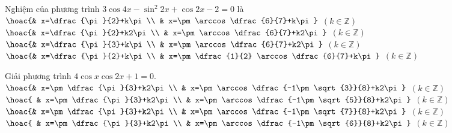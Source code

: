 \begin{ex}%
	Nghiệm của phương trình $3\cos 4x-\sin^2 2x+\cos 2x-2=0$ là 
	\choice
	{$\hoac{& x=\dfrac{\pi }{2}+k\pi  \\ & x=\pm \arccos \dfrac{6}{7}+k\pi }$ $\left(k\in \mathbb{Z}\right)$}
	{$\hoac{& x=\dfrac{\pi }{2}+k2\pi \\ & x=\pm \arccos \dfrac{6}{7}+k2\pi }$ $\left(k\in \mathbb{Z}\right)$}
	{$\hoac{& x=\dfrac{\pi }{3}+k\pi \\ & x=\pm \arccos \dfrac{6}{7}+k2\pi }$ $\left(k\in \mathbb{Z}\right)$}
	{\True $\hoac{& x=\dfrac{\pi }{2}+k\pi  \\ & x=\pm \dfrac{1}{2} \arccos \dfrac{6}{7}+k\pi }$ $\left(k\in \mathbb{Z}\right)$}
\end{ex}

\begin{ex}%
	
	Giải phương trình $4 \cos x\cos 2x+1=0$.
	\choice
	{$\hoac{& x=\pm \dfrac{\pi }{3}+k2\pi  \\ & x=\pm \arccos \dfrac{-1\pm \sqrt{3}}{8}+k2\pi }$ $\left(k\in \mathbb{Z}\right)$}
	{\True $\hoac{
			& x=\pm \dfrac{\pi }{3}+k2\pi  \\ & x=\pm \arccos \dfrac{-1\pm \sqrt{5}}{8}+k2\pi }$ $\left(k\in \mathbb{Z}\right)$}
	{$\hoac{& x=\pm \dfrac{\pi }{3}+k2\pi \\ & x=\pm \arccos \dfrac{-1\pm \sqrt{7}}{8}+k2\pi }$ $\left(k\in \mathbb{Z}\right)$}
	{$\hoac{
			& x=\pm \dfrac{\pi }{3}+k2\pi \\ & x=\pm \arccos \dfrac{-1\pm \sqrt{6}}{8}+k2\pi }$ $\left(k\in \mathbb{Z}\right)$}
\end{ex}

